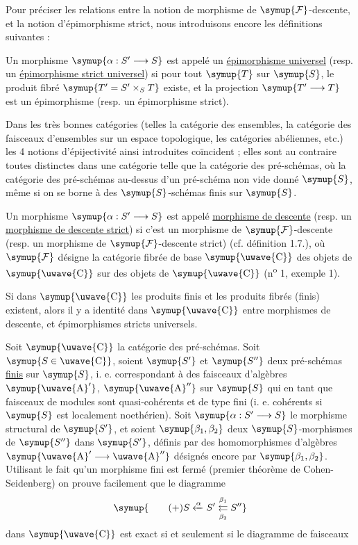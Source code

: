 Pour préciser les relations entre la notion de morphisme de
$\symup{\mathcal F}$-descente, et la notion d'épimorphisme strict, nous introduisons
encore les définitions suivantes :

 Un morphisme $\symup{\alpha:S'\longrightarrow S}$ est appelé
un \uline{épimorphisme universel} (resp. un \uline{épimorphisme strict universel})
si pour tout $\symup{T}$ sur $\symup{S}$, le produit fibré $\symup{T'=S'\times_ST}$ existe, et la
projection $\symup{T'\longrightarrow T}$ est un épimorphisme (resp. un épimorphisme
strict).

Dans les très bonnes catégories (telles la catégorie des ensembles, la
catégorie des faisceaux d'ensembles sur un espace topologique, les catégories
abéliennes, etc.) les 4 notions d'épijectivité ainsi introduites
coïncident ; elles sont au contraire toutes distinctes dans une catégorie telle
que la catégorie des pré-schémas, où la catégorie des pré-schémas au-dessus d'un
pré-schéma non vide donné $\symup{S}$, même si on se borne à des $\symup{S}$-schémas finis sur
$\symup{S}$.

 Un morphisme $\symup{\alpha:S'\longrightarrow S}$ est appelé
\uline{morphisme de descente} (resp. un \uline{morphisme de descente strict}) si
c'est un morphisme de $\symup{\mathcal F}$-descente (resp. un morphisme de
$\symup{\mathcal F}$-descente strict) (cf. définition 1.7.), où $\symup{\mathcal F}$ désigne la
catégorie fibrée de base $\symup{\text{\uwave{C}}}$ des objets de $\symup{\text{\uwave{C}}}$ sur des objets
de $\symup{\text{\uwave{C}}}$ (n\textsuperscript{o} 1, exemple 1).

 Si dans $\symup{\text{\uwave{C}}}$ les produits finis et les
produits fibrés (finis) existent, alors il y a identité dans $\symup{\text{\uwave{C}}}$ entre
morphismes de descente, et épimorphismes stricts universels.

 Soit $\symup{\text{\uwave{C}}}$ la catégorie des pré-schémas. Soit
$\symup{S\in\text{\uwave{C}}}$, soient $\symup{S'}$ et $\symup{S''}$ deux pré-schémas \uline{finis} sur $\symup{S}$, i. e.
correspondant à des faisceaux d'algèbres $\symup{\text{\uwave{A}}'}$, $\symup{\text{\uwave{A}}''}$ sur $\symup{S}$
qui en tant que faisceaux de modules sont quasi-cohérents et de type fini
(i. e. cohérents si $\symup{S}$ est localement noethérien). Soit
$\symup{\alpha:S'\longrightarrow S}$ le morphisme structural de $\symup{S'}$, et soient
$\symup{\beta_1,\beta_2}$ deux $\symup{S}$-morphismes de $\symup{S''}$ dans $\symup{S'}$, définis par des
homomorphismes d'algèbres $\symup{\text{\uwave{A}}'\longrightarrow\text{\uwave{A}}''}$ désignés
encore par $\symup{\beta_1,\beta_2}$. Utilisant le fait qu'un morphisme fini est fermé
(premier théorème de Cohen-Seidenberg) on prouve facilement que le diagramme
\[
  \symup{\tag{+}
  S\xleftarrow{\alpha}S'
  \overset{\beta_1}{\underset{\beta_2}{\leftleftarrows}}S''}
\]
dans $\symup{\text{\uwave{C}}}$ est exact si et seulement si le diagramme de faisceaux


